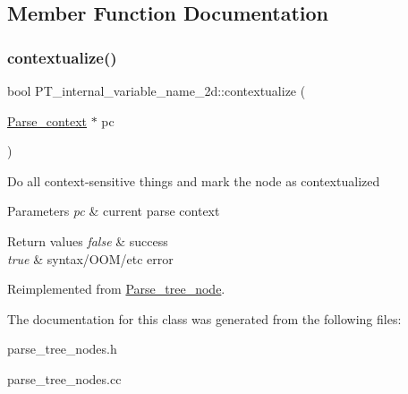 \subsection{Member Function Documentation}
\mbox{\label{classPT__internal__variable__name__2d_a710255bf525ff2aca0c254c15a1882f6}} 
\subsubsection{\texorpdfstring{contextualize()}{contextualize()}}
{\footnotesize\ttfamily bool P\+T\+\_\+internal\+\_\+variable\+\_\+name\+\_\+2d\+::contextualize (\begin{DoxyParamCaption}\item[{\mbox{\hyperlink{structParse__context}{Parse\+\_\+context}} $\ast$}]{pc }\end{DoxyParamCaption})\hspace{0.3cm}{\ttfamily [virtual]}}

Do all context-\/sensitive things and mark the node as contextualized


\begin{DoxyParams}{Parameters}
{\em pc} & current parse context\\
\hline
\end{DoxyParams}

\begin{DoxyRetVals}{Return values}
{\em false} & success \\
\hline
{\em true} & syntax/\+O\+O\+M/etc error \\
\hline
\end{DoxyRetVals}


Reimplemented from \mbox{\hyperlink{classParse__tree__node_a22d93524a537d0df652d7efa144f23da}{Parse\+\_\+tree\+\_\+node}}.



The documentation for this class was generated from the following files\+:\begin{DoxyCompactItemize}
\item 
parse\+\_\+tree\+\_\+nodes.\+h\item 
parse\+\_\+tree\+\_\+nodes.\+cc\end{DoxyCompactItemize}
